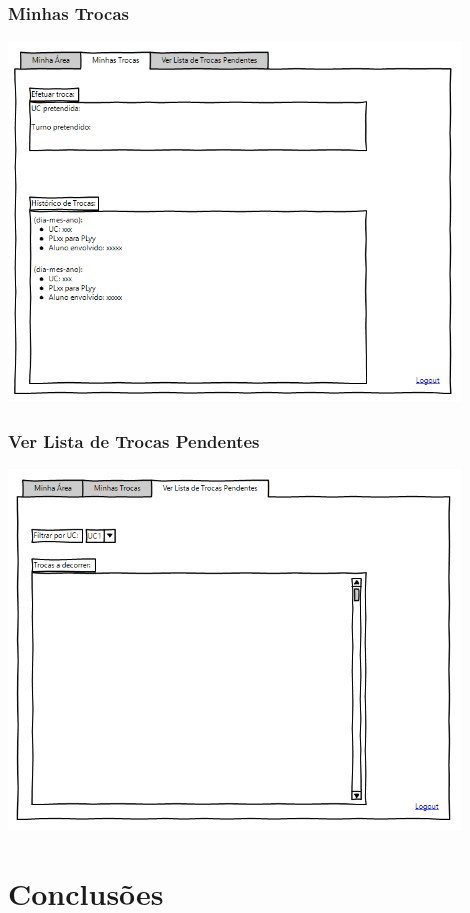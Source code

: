\documentclass[a4paper]{article}
\begin{document}
\subsubsection{Minhas Trocas}
\includegraphics[width=12cm]{interface_3}\break

\subsubsection{Ver Lista de Trocas Pendentes}
\includegraphics[width=12cm]{interface_4}\break



\pagebreak
\section{Conclusões}
\label{sec:4}

\hspace{3mm}
\end{document}
